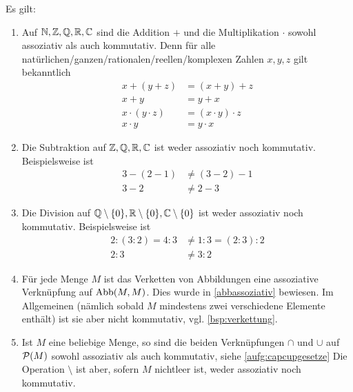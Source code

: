 \begin{bsp}
    Es gilt:
    \begin{enumerate}
        \item Auf $\mathbb N,\mathbb Z,\mathbb Q,\mathbb R,\mathbb C$ sind die Addition $+$ und die Multiplikation $\cdot$ sowohl assoziativ als auch kommutativ. Denn für alle natürlichen/ganzen/rationalen/reellen/komplexen Zahlen $x,y,z$ gilt bekanntlich
        \begin{align*}
            x+(y+z)& = (x+y)+z  \\
            x+y & = y+x \\
            x\cdot (y\cdot z) & = (x\cdot y)\cdot z  \\
            x\cdot y & = y\cdot x
        \end{align*}
        \item Die Subtraktion auf $\mathbb Z,\mathbb Q,\mathbb R,\mathbb C$ ist weder assoziativ noch kommutativ. Beispielsweise ist
        \begin{align*}
            3-(2-1) &\neq  (3-2)-1  \\
            3-2 &\neq 2-3
        \end{align*}
        \item Die Division auf $\mathbb Q\setminus \{0\},\mathbb R\setminus \{0\},\mathbb C\setminus \{0\}$ ist weder assoziativ noch kommutativ. Beispielsweise ist
        \begin{align*}
            2:(3:2) = 4:3 &\neq 1:3 = (2:3):2 \\
            2 : 3 & \neq 3:2
        \end{align*}
        \item Für jede Menge $M$ ist das Verketten von Abbildungen eine assoziative Verknüpfung auf $\operatorname{Abb}(M,M)$. Dies wurde in \cref{abbassoziativ} bewiesen. Im Allgemeinen (nämlich sobald $M$ mindestens zwei verschiedene Elemente enthält) ist sie aber nicht kommutativ, vgl. \cref{bsp:verkettung}.
        \item Ist $M$ eine beliebige Menge, so sind die beiden Verknüpfungen $\cap$ und $\cup$ auf $\mathcal P(M)$ sowohl assoziativ als auch kommutativ, siehe \cref{aufg:capcupgesetze} Die Operation $\setminus$ ist aber, sofern $M$ nichtleer ist, weder assoziativ noch kommutativ.
    \end{enumerate}
\end{bsp}


